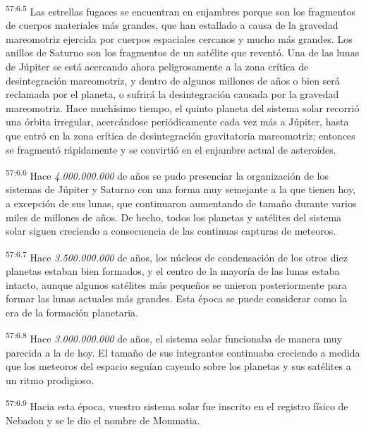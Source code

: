 \par
\textsuperscript{57:6.5} Las estrellas fugaces se encuentran en enjambres porque son los fragmentos de cuerpos materiales más grandes, que han estallado a causa de la gravedad mareomotriz ejercida por cuerpos espaciales cercanos y mucho más grandes. Los anillos de Saturno son los fragmentos de un satélite que reventó. Una de las lunas de Júpiter se está acercando ahora peligrosamente a la zona crítica de desintegración mareomotriz, y dentro de algunos millones de años o bien será reclamada por el planeta, o sufrirá la desintegración causada por la gravedad mareomotriz. Hace muchísimo tiempo, el quinto planeta del sistema solar recorrió una órbita irregular, acercándose periódicamente cada vez más a Júpiter, hasta que entró en la zona crítica de desintegración gravitatoria mareomotriz; entonces se fragmentó rápidamente y se convirtió en el enjambre actual de asteroides.

\par
\textsuperscript{57:6.6} Hace \textit{4.000.000.000} de años se pudo presenciar la organización de los sistemas de Júpiter y Saturno con una forma muy semejante a la que tienen hoy, a excepción de sus lunas, que continuaron aumentando de tamaño durante varios miles de millones de años. De hecho, todos los planetas y satélites del sistema solar siguen creciendo a consecuencia de las continuas capturas de meteoros.

\par
\textsuperscript{57:6.7} Hace \textit{3.500.000.000} de años, los núcleos de condensación de los otros diez planetas estaban bien formados, y el centro de la mayoría de las lunas estaba intacto, aunque algunos satélites más pequeños se unieron posteriormente para formar las lunas actuales más grandes. Esta época se puede considerar como la era de la formación planetaria.

\par
\textsuperscript{57:6.8} Hace \textit{3.000.000.000} de años, el sistema solar funcionaba de manera muy parecida a la de hoy. El tamaño de sus integrantes continuaba creciendo a medida que los meteoros del espacio seguían cayendo sobre los planetas y sus satélites a un ritmo prodigioso.

\par
\textsuperscript{57:6.9} Hacia esta época, vuestro sistema solar fue inscrito en el registro físico de Nebadon y se le dio el nombre de Monmatia.

